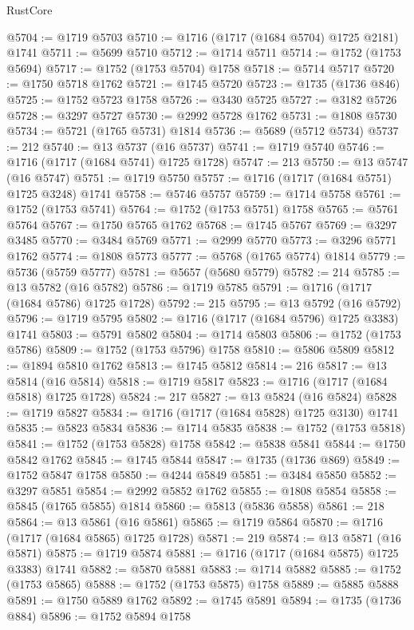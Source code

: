 \begin{lexlean}{RustCore}
\begin{coremodule}
@5704 := @1719 @5703
@5710 := @1716 (@1717 (@1684 @5704) @1725 @2181) @1741
@5711 := @5699 @5710
@5712 := @1714 @5711
@5714 := @1752 (@1753 @5694)
@5717 := @1752 (@1753 @5704) @1758
@5718 := @5714 @5717
@5720 := @1750 @5718 @1762
@5721 := @1745 @5720
@5723 := @1735 (@1736 @846)
@5725 := @1752 @5723 @1758
@5726 := @3430 @5725
@5727 := @3182 @5726
@5728 := @3297 @5727
@5730 := @2992 @5728 @1762
@5731 := @1808 @5730
@5734 := @5721 (@1765 @5731) @1814
@5736 := @5689 (@5712 @5734)
@5737 := 212
@5740 := @13 @5737 (@16 @5737)
@5741 := @1719 @5740
@5746 := @1716 (@1717 (@1684 @5741) @1725 @1728)
@5747 := 213
@5750 := @13 @5747 (@16 @5747)
@5751 := @1719 @5750
@5757 := @1716 (@1717 (@1684 @5751) @1725 @3248) @1741
@5758 := @5746 @5757
@5759 := @1714 @5758
@5761 := @1752 (@1753 @5741)
@5764 := @1752 (@1753 @5751) @1758
@5765 := @5761 @5764
@5767 := @1750 @5765 @1762
@5768 := @1745 @5767
@5769 := @3297 @3485
@5770 := @3484 @5769
@5771 := @2999 @5770
@5773 := @3296 @5771 @1762
@5774 := @1808 @5773
@5777 := @5768 (@1765 @5774) @1814
@5779 := @5736 (@5759 @5777)
@5781 := @5657 (@5680 @5779)
@5782 := 214
@5785 := @13 @5782 (@16 @5782)
@5786 := @1719 @5785
@5791 := @1716 (@1717 (@1684 @5786) @1725 @1728)
@5792 := 215
@5795 := @13 @5792 (@16 @5792)
@5796 := @1719 @5795
@5802 := @1716 (@1717 (@1684 @5796) @1725 @3383) @1741
@5803 := @5791 @5802
@5804 := @1714 @5803
@5806 := @1752 (@1753 @5786)
@5809 := @1752 (@1753 @5796) @1758
@5810 := @5806 @5809
@5812 := @1894 @5810 @1762
@5813 := @1745 @5812
@5814 := 216
@5817 := @13 @5814 (@16 @5814)
@5818 := @1719 @5817
@5823 := @1716 (@1717 (@1684 @5818) @1725 @1728)
@5824 := 217
@5827 := @13 @5824 (@16 @5824)
@5828 := @1719 @5827
@5834 := @1716 (@1717 (@1684 @5828) @1725 @3130) @1741
@5835 := @5823 @5834
@5836 := @1714 @5835
@5838 := @1752 (@1753 @5818)
@5841 := @1752 (@1753 @5828) @1758
@5842 := @5838 @5841
@5844 := @1750 @5842 @1762
@5845 := @1745 @5844
@5847 := @1735 (@1736 @869)
@5849 := @1752 @5847 @1758
@5850 := @4244 @5849
@5851 := @3484 @5850
@5852 := @3297 @5851
@5854 := @2992 @5852 @1762
@5855 := @1808 @5854
@5858 := @5845 (@1765 @5855) @1814
@5860 := @5813 (@5836 @5858)
@5861 := 218
@5864 := @13 @5861 (@16 @5861)
@5865 := @1719 @5864
@5870 := @1716 (@1717 (@1684 @5865) @1725 @1728)
@5871 := 219
@5874 := @13 @5871 (@16 @5871)
@5875 := @1719 @5874
@5881 := @1716 (@1717 (@1684 @5875) @1725 @3383) @1741
@5882 := @5870 @5881
@5883 := @1714 @5882
@5885 := @1752 (@1753 @5865)
@5888 := @1752 (@1753 @5875) @1758
@5889 := @5885 @5888
@5891 := @1750 @5889 @1762
@5892 := @1745 @5891
@5894 := @1735 (@1736 @884)
@5896 := @1752 @5894 @1758

\end{coremodule}
\end{lexlean}
